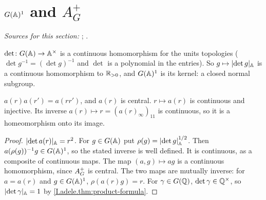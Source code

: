 \section{\texorpdfstring{$G(\A)^1$ and $A_G^+$}{G(𝔸)¹ and AG⁺}}\label{sec:topgrp-norm-one}

\noindent\emph{Sources for this section:} \cite[§§1--2]{AIntro}; \cite[Lecture I]{Gel}.

\begin{definition}[$G(\A)^1$]
\end{definition}
\noindent $\det\colon G(\mathbb{A})\to\mathbb{A}^\times$ is a continuous homomorphism for the units topologies ($\det g^{-1}=(\det g)^{-1}$
and $\det$ is a polynomial in the entries). So $g\mapsto\lvert\det g\rvert_{\mathbb{A}}$ is a continuous homomorphism to $\mathbb{R}_{>0}$, and
$G(\A)^1$ is its kernel: a closed normal subgroup.

\begin{definition}[$\AGplus$]
\end{definition}
\noindent $a(r)a(r')=a(rr')$, and $a(r)$ is central. $r\mapsto a(r)$ is continuous and injective. Its inverse
$a(r)\mapsto r=(a(r)_\infty)_{11}$ is continuous, so it is a homeomorphism onto its image.

\begin{theorem}[$G(\A)=\AGplus\times G(\A)^1$]
\end{theorem}
\begin{proof}
$\lvert\det a(r)\rvert_{\mathbb{A}}=r^2$. For $g\in G(\mathbb{A})$ put $\rho(g)=\lvert\det g\rvert_{\mathbb{A}}^{1/2}$. Then $a(\rho(g))^{-1}g\in G(\mathbb{A})^1$, so
the stated inverse is well defined. It is continuous, as a composite of continuous maps. The map $(a,g)\mapsto ag$ is a
continuous homomorphism, since $\AGplus$ is central. The two maps are mutually inverse: for $a=a(r)$ and $g\in G(\mathbb{A})^1$,
$\rho(a(r)g)=r$. For $\gamma\in G(\mathbb{Q})$, $\det\gamma\in\mathbb{Q}^\times$, so $\lvert\det\gamma\rvert_{\mathbb{A}}=1$ by
\cref{I.adele.thm:product-formula}.
\end{proof}

